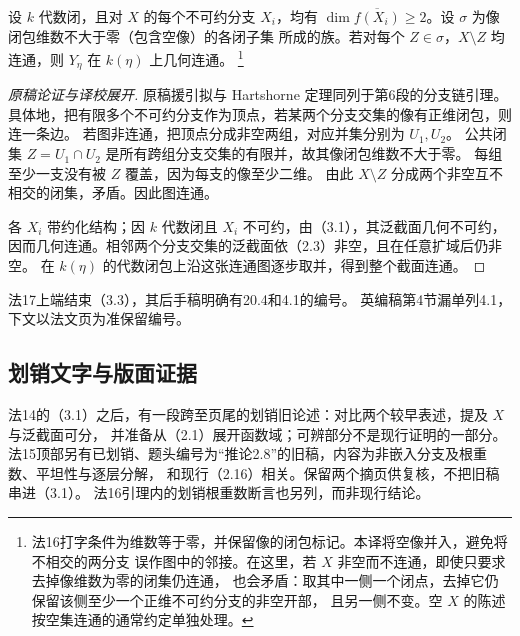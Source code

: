 设 $k$ 代数闭，且对 $X$ 的每个不可约分支 $X_i$，均有
$\dim\overline{f(X_i)}\ge2$。设 $\sigma$ 为像闭包维数不大于零（包含空像）的各闭子集
所成的族。若对每个 $Z\in\sigma$，$X\setminus Z$ 均连通，则 $Y_\eta$ 在 $k(\eta)$ 上几何连通。
\footnote{法16打字条件为维数等于零，并保留像的闭包标记。本译将空像并入，避免将不相交的两分支
误作图中的邻接。在这里，若 $X$ 非空而不连通，即使只要求去掉像维数为零的闭集仍连通，
也会矛盾：取其中一侧一个闭点，去掉它仍保留该侧至少一个正维不可约分支的非空开部，
且另一侧不变。空 $X$ 的陈述按空集连通的通常约定单独处理。}
\begin{proof}[原稿论证与译校展开]
原稿援引拟与 Hartshorne 定理同列于第6段的分支链引理。
具体地，把有限多个不可约分支作为顶点，若某两个分支交集的像有正维闭包，则连一条边。
若图非连通，把顶点分成非空两组，对应并集分别为 $U_1,U_2$。
公共闭集 $Z=U_1\cap U_2$ 是所有跨组分支交集的有限并，故其像闭包维数不大于零。
每组至少一支没有被 $Z$ 覆盖，因为每支的像至少二维。
由此 $X\setminus Z$ 分成两个非空互不相交的闭集，矛盾。因此图连通。

各 $X_i$ 带约化结构；因 $k$ 代数闭且 $X_i$ 不可约，由（3.1），其泛截面几何不可约，
因而几何连通。相邻两个分支交集的泛截面依（2.3）非空，且在任意扩域后仍非空。
在 $k(\eta)$ 的代数闭包上沿这张连通图逐步取并，得到整个截面连通。
\end{proof}
\noindent 法17上端结束（3.3），其后手稿明确有20.4和4.1的编号。
英编稿第4节漏单列4.1，下文以法文页为准保留编号。

\subsection*{划销文字与版面证据}
法14的（3.1）之后，有一段跨至页尾的划销旧论述：对比两个较早表述，提及 $X$ 与泛截面可分，
并准备从（2.1）展开函数域；可辨部分不是现行证明的一部分。
法15顶部另有已划销、题头编号为“推论2.8”的旧稿，内容为非嵌入分支及根重数、平坦性与逐层分解，
和现行（2.16）相关。保留两个摘页供复核，不把旧稿串进（3.1）。
法16引理内的划销根重数断言也另列，而非现行结论。

\endgroup
